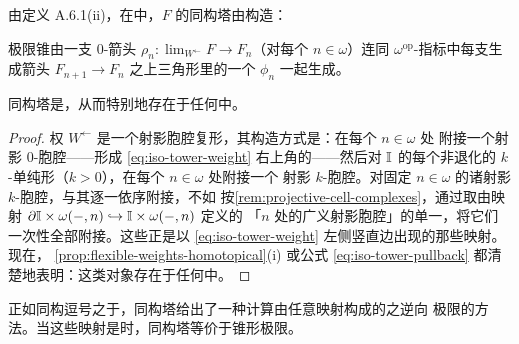 由定义 A.6.1(ii)，在\trInfinityCosmos{}中，$F$ 的同构塔由\trPullback{}构造：
\begin{rveq}\label{eq:iso-tower-pullback}
\end{rveq}

极限锥由一支 0-箭头 $\rho_{n}\colon\lim_{W^{\leftarrow}}F\to F_{n}$（对每个
$n\in\omega$）连同 $\omega^{\mathrm{op}}$-指标\trDiagram{}中每支生成箭头
$F_{n+1}\to F_{n}$ 之上三角形里的一个\trHomotopyCoherentIsomorphism{}
$\phi_{n}$ 一起生成。

\begin{lemma}\label{lem:iso-towers-flexible}
同构塔是\trFlexibleWeightedLimit{}，从而特别地存在于任何\trInfinityCosmos{}中。
\end{lemma}

\begin{proof}
权 $W^{\leftarrow}$ 是一个射影胞腔复形，其构造方式是：在每个 $n\in\omega$ 处
附接一个射影 0-胞腔——形成 \eqref{eq:iso-tower-weight} 右上角的\trCoproduct——然后对
$\mathbb{I}$ 的每个非退化的 $k$-单纯形（$k>0$），在每个 $n\in\omega$ 处附接一个
射影 $k$-胞腔。对固定 $n\in\omega$ 的诸射影 $k$-胞腔，与其逐一依序附接，不如
按\cref{rem:projective-cell-complexes}，通过取由映射
$\partial\mathbb{I}\times\omega(-,n)\hookrightarrow\mathbb{I}\times\omega(-,n)$ 定义的
「$n$ 处的广义射影胞腔」的单一\trPushout，将它们一次性全部附接。这些正是以
\eqref{eq:iso-tower-weight} 左侧竖直边出现的那些映射。现在，
\cref{prop:flexible-weights-homotopical}(i) 或公式 \eqref{eq:iso-tower-pullback}
都清楚地表明：这类对象存在于任何\trInfinityCosmos{}中。
\end{proof}

正如同构逗号之于\trPullback，同构塔给出了一种计算由任意映射构成的\trDiagram{}之逆向
极限的方法。当这些映射是\trIsofibration{}时，同构塔等价于锥形极限。

